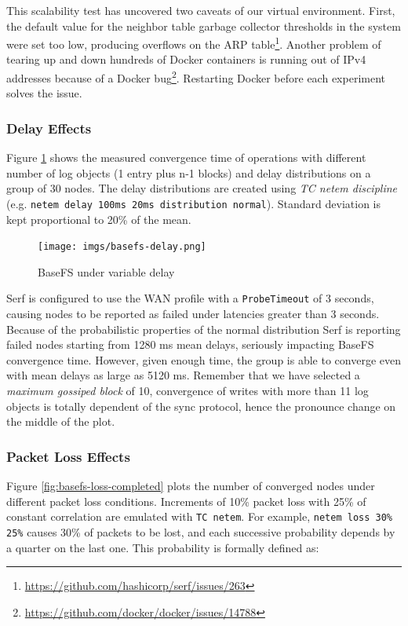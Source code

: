 \documentclass{sig-alternate}
\begin{document}
This scalability test has uncovered two caveats of our virtual environment. First, the default value for the neighbor table garbage collector thresholds in the system were set too low, producing overflows on the ARP table\footnote{\url{https://github.com/hashicorp/serf/issues/263}}. Another problem of tearing up and down hundreds of Docker containers is running out of IPv4 addresses because of a Docker bug\footnote{\url{https://github.com/docker/docker/issues/14788}}. Restarting Docker before each experiment solves the issue.


\subsubsection{Delay Effects}

Figure \ref{fig:basefs-delay} shows the measured convergence time of operations with different number of log objects (1 entry plus n-1 blocks) and delay distributions on a group of 30 nodes. The delay distributions are created using \textit{TC netem discipline} (e.g. \texttt{netem delay 100ms 20ms distribution normal}). Standard deviation is kept proportional to 20\% of the mean.

\begin{figure}
\centering
\texttt{[image: imgs/basefs-delay.png]}
\caption{BaseFS under variable delay}
\label{fig:basefs-delay}
\end{figure}

Serf is configured to use the WAN profile with a \texttt{ProbeTimeout} of 3 seconds, causing nodes to be reported as failed under latencies greater than 3 seconds. Because of the probabilistic properties of the normal distribution Serf is reporting failed nodes starting from 1280 ms mean delays, seriously impacting BaseFS convergence time. However, given enough time, the group is able to converge even with mean delays as large as 5120 ms. Remember that we have selected a \textit{maximum gossiped block} of 10, convergence of writes with more than 11 log objects is totally dependent of the sync protocol, hence the pronounce change on the middle of the plot.


\subsubsection{Packet Loss Effects}

Figure \ref{fig:basefs-loss-completed} plots the number of converged nodes under different packet loss conditions. Increments of 10\% packet loss with 25\% of constant correlation are emulated with \texttt{TC netem}. For example, \texttt{netem loss 30\% 25\%} causes 30\% of packets to be lost, and each successive probability depends by a quarter on the last one. This probability is formally defined as:
\end{document}
